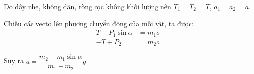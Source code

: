 \begin{enumerate}[label=\bfseries Câu \arabic*:]
{		Do dây nhẹ, không dãn, ròng rọc không khối lượng nên $T_1 = T_2 = T$, $a_1 = a_2 = a$.
		
		Chiếu các vectơ lên phương chuyển động của mỗi vật, ta được:
		\begin{align*}
			T - P_1 \sin \alpha &= m_1 a \\
			-T + P_2 &= m_2 a
		\end{align*}
		
		Suy ra $a=\dfrac{m_2 - m_1 \sin \alpha}{m_1 + m_2}g$.
	}
\end{enumerate}